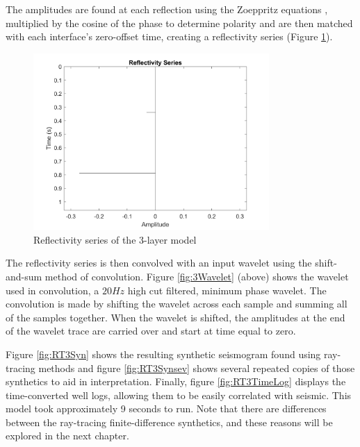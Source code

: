 \documentclass[12pt]{article}
\begin{document}
	The amplitudes are found at each reflection using the Zoeppritz equations \citep{zoeppritz1919}, multiplied by the cosine of the phase to determine polarity and are then matched with each interface's zero-offset time, creating a reflectivity series (Figure \ref{fig:RT3RefSeries}). 
	
\begin{figure}[!htb]
	\centering
	\includegraphics[width=0.8\textwidth]{Figures/RT3ReflectivitySeries.png}
	\caption[Ray-tracing 3-layer reflectivity series]{Reflectivity series of the 3-layer model}
	\label{fig:RT3RefSeries}
\end{figure}

	The reflectivity series is then convolved with an input wavelet using the shift-and-sum method of convolution. Figure \ref{fig:3Wavelet} (above) shows the wavelet used in convolution, a $20Hz$ high cut filtered, minimum phase wavelet. The convolution is made by shifting the wavelet across each sample and summing all of the samples together. When the wavelet is shifted, the amplitudes at the end of the wavelet trace are carried over and start at time equal to zero. 

	Figure \ref{fig:RT3Syn} shows the resulting synthetic seismogram found using ray-tracing methods and figure \ref{fig:RT3Synsev} shows several repeated copies of those synthetics to aid in interpretation. Finally, figure \ref{fig:RT3TimeLog} displays the time-converted well logs, allowing them to be easily correlated with seismic. This model took approximately 9 seconds to run. Note that there are differences between the ray-tracing finite-difference synthetics, and these reasons will be explored in the next chapter.
\end{document}
